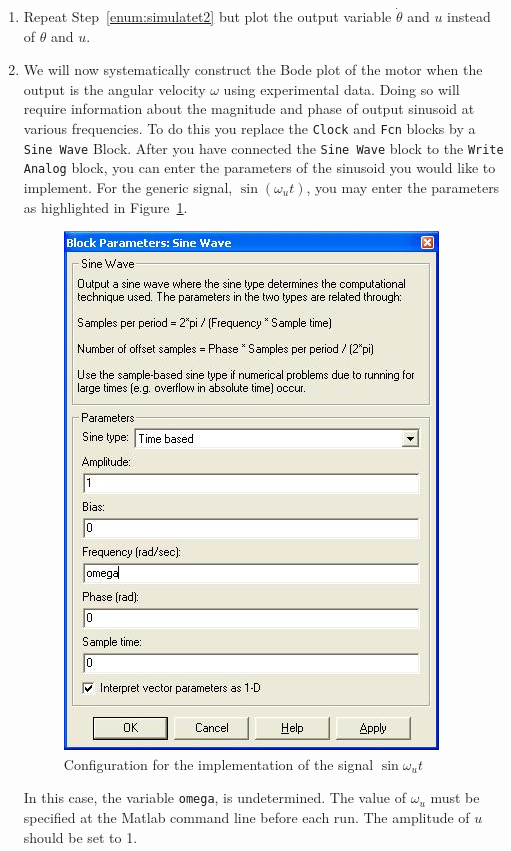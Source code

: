\begin{enumerate}
    \item Repeat Step~\ref{enum:simulatet2} but plot the output variable
          \(\dot\theta \) and \(u\) instead of \(\theta \) and \(u\).

    \item We will now systematically construct the Bode plot of the motor when
          the output is the angular velocity \(\omega \) using experimental data. Doing so
          will require information about the magnitude and phase of output sinusoid at
          various frequencies.  To do this you replace the \verb|Clock| and \verb|Fcn|
          blocks by a \verb|Sine Wave| Block.  After you have connected the
          \verb|Sine Wave| block to the \verb|Write Analog| block, you can enter the
          parameters of the sinusoid you would like to implement.  For the generic
          signal, \(\sin(\omega_u t)\), you may enter the parameters as highlighted in
          Figure~\ref{fig:sineConfig}.
          \begin{figure}[htbp]
              \centering
              \includegraphics{pix/freqResponseSineConfig.jpg}
              \caption{Configuration for the implementation of the signal
                  \(\sin{\omega_u t}\)}\label{fig:sineConfig}
          \end{figure}
          In this case, the variable \verb|omega|, is undetermined.  The value of
          \(\omega_u\) must be specified at the \textsf{Matlab} command line before each
          run.  The amplitude of \(u\) should be set to 1.


\end{enumerate}
